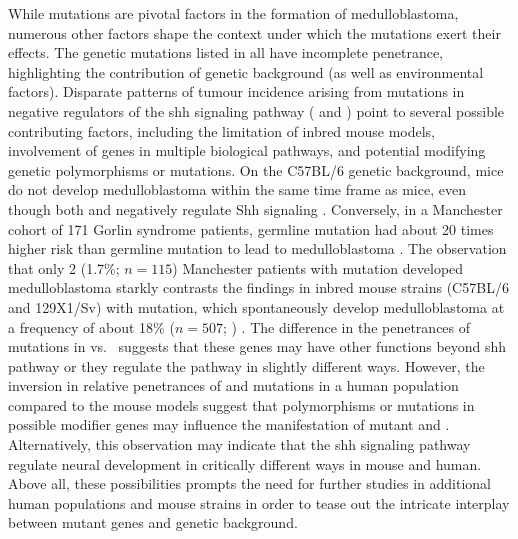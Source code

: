 While mutations are pivotal factors in the formation of medulloblastoma, numerous other factors shape the context under which the mutations exert their effects. The genetic mutations listed in  all have incomplete penetrance, highlighting the contribution of genetic background (as well as environmental factors). Disparate patterns of tumour incidence arising from mutations in negative regulators of the \gls{shh} signaling pathway ( and ) point to several possible contributing factors, including the limitation of inbred mouse models, involvement of genes in multiple biological pathways, and potential modifying genetic polymorphisms or mutations. On the C57BL/6 genetic background, \high{+/-} mice do not develop medulloblastoma within the same time frame as \high{+/-} mice, even though both  and  negatively regulate Shh signaling . Conversely, in a Manchester cohort of 171 Gorlin syndrome patients, germline  mutation had about 20 times higher risk than germline  mutation to lead to medulloblastoma . The observation that only 2 (1.7\%; $n = 115$) Manchester patients with  mutation developed medulloblastoma  starkly contrasts the findings in inbred mouse strains (C57BL/6 and 129X1/Sv) with  mutation, which spontaneously develop medulloblastoma at a frequency of about 18\% ($n = 507$; ) . The difference in the penetrances of mutations in  vs.\  suggests that these genes may have other functions beyond \gls{shh} pathway or they regulate the pathway in slightly different ways. However, the inversion in relative penetrances of  and  mutations in a human population compared to the mouse models suggest that polymorphisms or mutations in possible modifier genes may influence the manifestation of mutant  and . Alternatively, this observation may indicate that the \gls{shh} signaling pathway regulate neural development in critically different ways in mouse and human. Above all, these possibilities prompts the need for further studies in additional human populations and mouse strains in order to tease out the intricate interplay between mutant genes and genetic background. 

